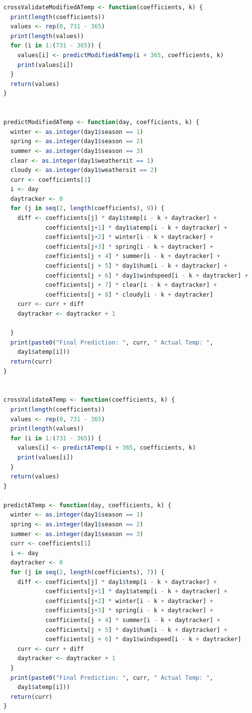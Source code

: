 \documentclass[12pt]{article}
\begin{document}
\begin{lstlisting}[language=R]
crossValidateModifiedATemp <- function(coefficients, k) {
  print(length(coefficients))
  values <- rep(0, 731 - 365)
  print(length(values))
  for (i in 1:(731 - 365)) {
    values[i] <- predictModifiedATemp(i + 365, coefficients, k)
    print(values[i])
  }
  return(values)
}


predictModifiedATemp <- function(day, coefficients, k) {
  winter <- as.integer(day1$season == 1)
  spring <- as.integer(day1$season == 2)
  summer <- as.integer(day1$season == 3)
  clear <- as.integer(day1$weathersit == 1)
  cloudy <- as.integer(day1$weathersit == 2)
  curr <- coefficients[1]
  i <- day
  daytracker <- 0
  for (j in seq(2, length(coefficients), 9)) {
    diff <- coefficients[j] * day1$temp[i - k + daytracker] + 
    		coefficients[j+1] * day1$atemp[i - k + daytracker] + 
    		coefficients[j+2] * winter[i - k + daytracker] + 
    		coefficients[j+3] * spring[i - k + daytracker] + 
    		coefficients[j + 4] * summer[i - k + daytracker] +
    		coefficients[j + 5] * day1$hum[i - k + daytracker] +
    		coefficients[j + 6] * day1$windspeed[i - k + daytracker] + 
    		coefficients[j + 7] * clear[i - k + daytracker] + 
    		coefficients[j + 8] * cloudy[i - k + daytracker]
    curr <- curr + diff
    daytracker <- daytracker + 1
    
  }
  print(paste0("Final Prediction: ", curr, " Actual Temp: ", 
  	day1$atemp[i]))
  return(curr)
}


crossValidateATemp <- function(coefficients, k) {
  print(length(coefficients))
  values <- rep(0, 731 - 365)
  print(length(values))
  for (i in 1:(731 - 365)) {
    values[i] <- predictATemp(i + 365, coefficients, k)
    print(values[i])
  }
  return(values)
}

predictATemp <- function(day, coefficients, k) {
  winter <- as.integer(day1$season == 1)
  spring <- as.integer(day1$season == 2)
  summer <- as.integer(day1$season == 3)
  curr <- coefficients[1]
  i <- day
  daytracker <- 0
  for (j in seq(2, length(coefficients), 7)) {
    diff <- coefficients[j] * day1$temp[i - k + daytracker] + 	
    		coefficients[j+1] * day1$atemp[i - k + daytracker] + 	
    		coefficients[j+2] * winter[i - k + daytracker] + 
    		coefficients[j+3] * spring[i - k + daytracker] + 
    		coefficients[j + 4] * summer[i - k + daytracker] +
      		coefficients[j + 5] * day1$hum[i - k + daytracker] + 
      		coefficients[j + 6] * day1$windspeed[i - k + daytracker]
    curr <- curr + diff
    daytracker <- daytracker + 1
  }
  print(paste0("Final Prediction: ", curr, " Actual Temp: ", 
  	day1$atemp[i]))
  return(curr)
}


\end{lstlisting}
\end{document}
